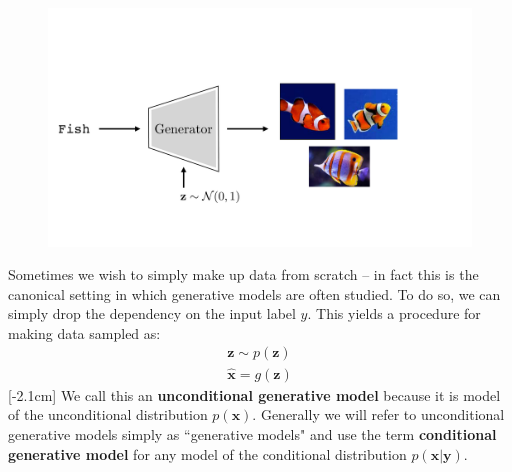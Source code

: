 \begin{figure}[h]
    \centering
    \hspace*{0.20\linewidth}\includegraphics[width=0.7\linewidth]{./figures/generative_models/image_generation_with_z.pdf}
    \label{fig:image_generation_with_z}
\end{figure}

Sometimes we wish to simply make up data from scratch -- in fact this is the canonical setting in which generative models are often studied. To do so, we can simply drop the dependency on the input label $y$. This yields a procedure for making data sampled as:
\begin{align}
    \mathbf{z} \sim p(\mathbf{z})\\
    \hat{\mathbf{x}} = g(\mathbf{z})
\end{align}
[-2.1cm]
We call this an \textbf{unconditional generative model} because it is model of the unconditional distribution $p(\mathbf{x})$. Generally we will refer to unconditional generative models simply as ``generative models" and use the term \textbf{conditional generative model} for any model of the conditional distribution $p(\mathbf{x} | \mathbf{y})$.

